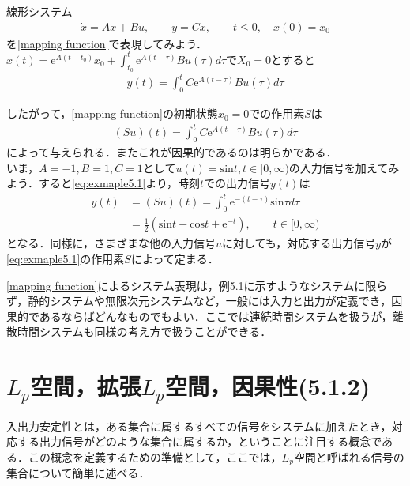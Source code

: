 \documentclass[a4paper,11pt,uplatex]{jsarticle} %
\theoremstyle{definition}	%
\begin{document}
\begin{tcolorbox}[title=例5.1,
drop small lifted shadow=black]
線形システム
\begin{align*}
\dot{x} = Ax + Bu, \qquad y = Cx, \qquad t \leq 0 , \quad x(0) = x_0
\end{align*}
を\eqref{mapping function}で表現してみよう．
$x(t) = \mathrm{e}^{A(t-t_0)} x_0 + \int_{t_0}^t \mathrm{e}^{A(t-\tau)} B u(\tau) d\tau$で$X_0 = 0$とすると
\begin{align*}
y(t) = \int_0^t C \textrm{e}^{A(t-\tau)} B u(\tau) d\tau
\end{align*}

したがって，\eqref{mapping function}の初期状態$x_0 = 0 $での作用素$S$は
\begin{align}
\label{eq:exmaple5.1}
(Su)(t) = \int_0^t C \textrm{e}^{A(t-\tau)} B u(\tau) d\tau
\end{align}
によって与えられる．またこれが因果的であるのは明らかである．\\
いま，$A = -1, B=1, C = 1$として$u(t) = \textrm{sin}t, t \in [0, \infty)$の入力信号を加えてみよう．すると\eqref{eq:exmaple5.1}より，時刻$t$での出力信号$y(t)$は
\begin{align*}
y(t) &= (Su) (t) = \int_0^t \textrm{e}^{-(t-\tau)} \textrm{sin}\tau d\tau \\
     &= \frac{1}{2} (\textrm{sin}t - \textrm{cos}t + \textrm{e}^{-t}), \qquad t \in [0, \infty)
\end{align*}
となる．同様に，さまざまな他の入力信号$u$に対しても，対応する出力信号$y$が\eqref{eq:exmaple5.1}の作用素$S$によって定まる．
\end{tcolorbox}

\eqref{mapping function}によるシステム表現は，例5.1に示すようなシステムに限らず，静的システムや無限次元システムなど，一般には入力と出力が定義でき，因果的であるならばどんなものでもよい．ここでは連続時間システムを扱うが，離散時間システムも同様の考え方で扱うことができる．

\section{$L_p$空間，拡張$L_p$空間，因果性(5.1.2)}
入出力安定性とは，ある集合に属するすべての信号をシステムに加えたとき，対応する出力信号がどのような集合に属するか，ということに注目する概念である．この概念を定義するための準備として，ここでは，$L_p$空間と呼ばれる信号の集合について簡単に述べる．
\end{document}
